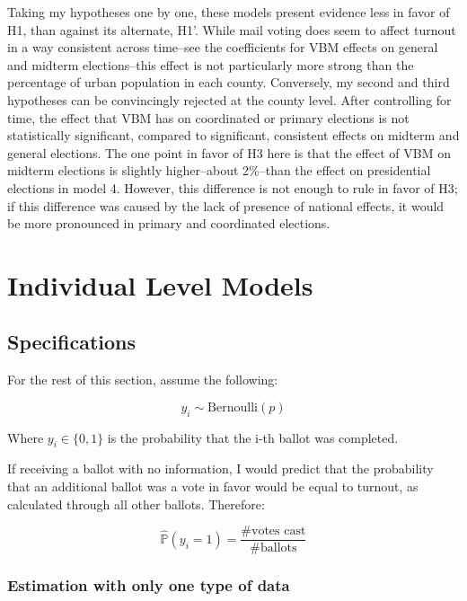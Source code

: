 \documentclass[12pt,twoside]{reedthesis}
\begin{document}
  Taking my hypotheses one by one, these models present evidence less in
  favor of H1, than against its alternate, H1'. While mail voting does
  seem to affect turnout in a way consistent across time--see the
  coefficients for VBM effects on general and midterm elections--this
  effect is not particularly more strong than the percentage of urban
  population in each county. Conversely, my second and third hypotheses
  can be convincingly rejected at the county level. After controlling for
  time, the effect that VBM has on coordinated or primary elections is not
  statistically significant, compared to significant, consistent effects
  on midterm and general elections. The one point in favor of H3 here is
  that the effect of VBM on midterm elections is slightly higher--about
  2\%--than the effect on presidential elections in model 4. However, this
  difference is not enough to rule in favor of H3; if this difference was
  caused by the lack of presence of national effects, it would be more
  pronounced in primary and coordinated elections.
  
  \section{Individual Level Models}\label{individual-level-models}
  
  \subsection{Specifications}\label{specifications-1}
  
  For the rest of this section, assume the following:
  
  \[y_i \sim \text{Bernoulli}(p)\]
  
  Where \(y_i \in \{0,1\}\) is the probability that the i-th ballot was
  completed.
  
  If receiving a ballot with no information, I would predict that the
  probability that an additional ballot was a vote in favor would be equal
  to turnout, as calculated through all other ballots. Therefore:
  
  \[\hat{\mathbb{P}}(y_i = 1) = \frac{\# \text{votes cast}}{\# \text{ballots}}\]
  
  \subsubsection{Estimation with only one type of
  data}\label{estimation-with-only-one-type-of-data}
  
\end{document}
